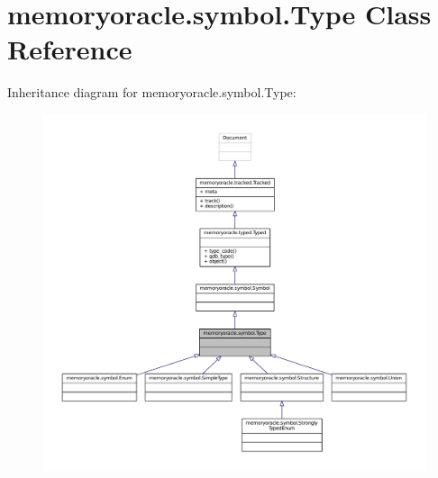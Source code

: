 \hypertarget{classmemoryoracle_1_1symbol_1_1Type}{}\section{memoryoracle.\+symbol.\+Type Class Reference}
\label{classmemoryoracle_1_1symbol_1_1Type}


Inheritance diagram for memoryoracle.\+symbol.\+Type\+:
\nopagebreak
\begin{figure}[H]
\begin{center}
\leavevmode
\includegraphics[width=350pt]{classmemoryoracle_1_1symbol_1_1Type__inherit__graph}
\end{center}
\end{figure}



